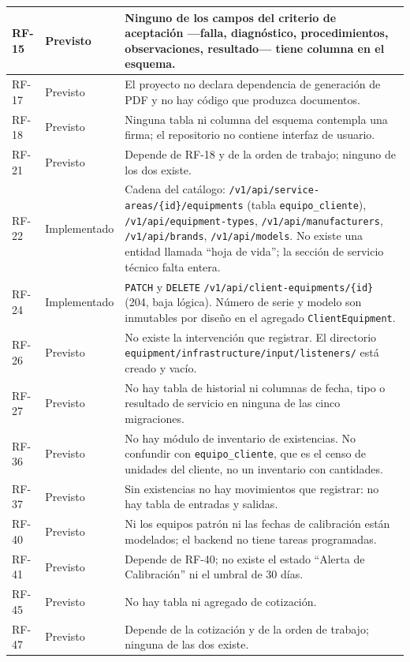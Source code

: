 \documentclass[12pt,varwidth=170mm,border=10pt]{standalone}
\newcommand{\ruta}[1]{\nolinkurl{#1}}
\begin{document}
\begin{center}
\begin{tabular}{|p{1.3cm}|p{2.4cm}|p{10.3cm}|}
\hline
RF-15 & Previsto & Ninguno de los campos del criterio de aceptación —falla, diagnóstico, procedimientos, observaciones, resultado— tiene columna en el esquema. \\
\hline
RF-17 & Previsto & El proyecto no declara dependencia de generación de PDF y no hay código que produzca documentos. \\
\hline
RF-18 & Previsto & Ninguna tabla ni columna del esquema contempla una firma; el repositorio no contiene interfaz de usuario. \\
\hline
RF-21 & Previsto & Depende de RF-18 y de la orden de trabajo; ninguno de los dos existe. \\
\hline
RF-22 & Implementado & Cadena del catálogo: \ruta{/v1/api/service-areas/{id}/equipments} (tabla \texttt{equipo\_cliente}), \ruta{/v1/api/equipment-types}, \ruta{/v1/api/manufacturers}, \ruta{/v1/api/brands}, \ruta{/v1/api/models}. No existe una entidad llamada ``hoja de vida''; la sección de servicio técnico falta entera. \\
\hline
RF-24 & Implementado & \texttt{PATCH} y \texttt{DELETE} \ruta{/v1/api/client-equipments/{id}} (204, baja lógica). Número de serie y modelo son inmutables por diseño en el agregado \texttt{ClientEquipment}. \\
\hline
RF-26 & Previsto & No existe la intervención que registrar. El directorio \ruta{equipment/infrastructure/input/listeners/} está creado y vacío. \\
\hline
RF-27 & Previsto & No hay tabla de historial ni columnas de fecha, tipo o resultado de servicio en ninguna de las cinco migraciones. \\
\hline
RF-36 & Previsto & No hay módulo de inventario de existencias. No confundir con \texttt{equipo\_cliente}, que es el censo de unidades del cliente, no un inventario con cantidades. \\
\hline
RF-37 & Previsto & Sin existencias no hay movimientos que registrar: no hay tabla de entradas y salidas. \\
\hline
RF-40 & Previsto & Ni los equipos patrón ni las fechas de calibración están modelados; el backend no tiene tareas programadas. \\
\hline
RF-41 & Previsto & Depende de RF-40; no existe el estado ``Alerta de Calibración'' ni el umbral de 30 días. \\
\hline
RF-45 & Previsto & No hay tabla ni agregado de cotización. \\
\hline
RF-47 & Previsto & Depende de la cotización y de la orden de trabajo; ninguna de las dos existe. \\

\end{tabular}
\end{center}
\end{document}
